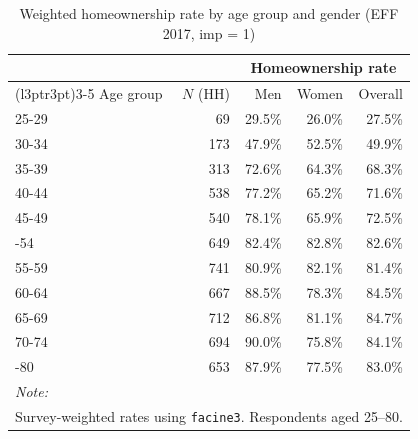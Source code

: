 \begin{table}[!h]

\caption{\label{tab:homeownership_age_gender}Weighted homeownership rate by age group and gender (EFF 2017, imp = 1)}
\centering
\begin{tabular}[t]{lrrrr}
\toprule
\multicolumn{2}{c}{ } & \multicolumn{3}{c}{Homeownership rate} \\
\cmidrule(l{3pt}r{3pt}){3-5}
Age group & $N$ (HH) & Men & Women & Overall\\
\midrule
25-29 & 69 & 29.5\% & 26.0\% & 27.5\%\\
30-34 & 173 & 47.9\% & 52.5\% & 49.9\%\\
35-39 & 313 & 72.6\% & 64.3\% & 68.3\%\\
40-44 & 538 & 77.2\% & 65.2\% & 71.6\%\\
45-49 & 540 & 78.1\% & 65.9\% & 72.5\%\\
\addlinespace
50-54 & 649 & 82.4\% & 82.8\% & 82.6\%\\
55-59 & 741 & 80.9\% & 82.1\% & 81.4\%\\
60-64 & 667 & 88.5\% & 78.3\% & 84.5\%\\
65-69 & 712 & 86.8\% & 81.1\% & 84.7\%\\
70-74 & 694 & 90.0\% & 75.8\% & 84.1\%\\
\addlinespace
75-80 & 653 & 87.9\% & 77.5\% & 83.0\%\\
\bottomrule
\multicolumn{5}{l}{\rule{0pt}{1em}\textit{Note:}}\\
\multicolumn{5}{l}{\rule{0pt}{1em}Survey-weighted rates using \texttt{facine3}. Respondents aged 25--80.}\\
\end{tabular}
\end{table}
